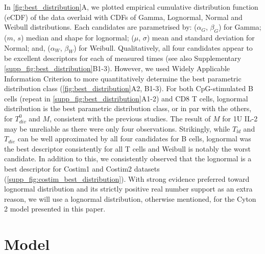 \documentclass[11pt, a4paper]{article}
\begin{document}
In \cref{fig:best_distribution}A, we plotted empirical cumulative distribution function (eCDF) of the data overlaid with CDFs of Gamma, Lognormal, Normal and Weibull distributions. Each candidates are parametrised by: ($\alpha_G$, $\beta_G$) for Gamma; ($m$, $s$) median and shape for lognormal; ($\mu$, $\sigma$) mean and standard deviation for Normal; and, ($\alpha_W$, $\beta_W$) for Weibull. Qualitatively, all four candidates appear to be excellent descriptors for each of measured times (see also Supplementary \cref{supp_fig:best_distribution}B1-3). However, we used Widely Applicable Information Criterion \parencite{Watanabe.2010} to more quantitatively determine the best parametric distribution class (\cref{fig:best_distribution}A2, B1-3). For both CpG-stimulated B cells (repeat in \cref{supp_fig:best_distribution}A1-2) and CD8 T cells, lognormal distribution is the best parametric distribution class, or in par with the others, for $T_{div}^0$ and $M$, consistent with the previous studies. The result of $M$ for 1U IL-2 may be unreliable as there were only four observations. Strikingly, while $T_{ld}$ and $T_{die}$ can be well approximated by all four candidates for B cells, lognormal was the best descriptor consistently for all T cells and Weibull is notably the worst candidate. In addition to this, we consistently observed that the lognormal is a best descriptor for Costim1 and Costim2 datasets (\cref{supp_fig:costim_best_distribution}). With strong evidence preferred toward lognormal distribution and its strictly positive real number support as an extra reason, we will use a lognormal distribution, otherwise mentioned, for the Cyton 2 model presented in this paper.


\nolinenumbers
\section{Model}
\end{document}
